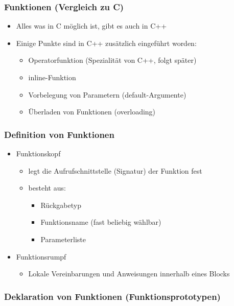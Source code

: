 \subsubsection{Funktionen (Vergleich zu C)\hfill}
\label{sec:unterunterabschnitt}
\begin{itemize}
	\item Alles was in C möglich ist, gibt es auch in C++
	\item Einige Punkte sind in C++ zusätzlich eingeführt worden:
	\begin{itemize}
		\item Operatorfunktion (Spezialität von C++, folgt später)
		\item inline-Funktion
		\item Vorbelegung von Parametern (default-Argumente)
		\item Überladen von Funktionen (overloading)
	\end{itemize}
\end{itemize}

\subsubsection{Definition von Funktionen\hfill}
\label{sec:unterunterabschnitt}
\begin{itemize}
	\item Funktionskopf
	\begin{itemize}
		\item legt die Aufrufschnittstelle (Signatur) der Funktion fest
		\item besteht aus:
		\begin{itemize}
			\item Rückgabetyp
			\item Funktionsname (fast beliebig wählbar)
			\item Parameterliste
		\end{itemize}
	\end{itemize}
	\item Funktionsrumpf
	\begin{itemize}
		\item Lokale Vereinbarungen und Anweisungen innerhalb eines Blocks
	\end{itemize}
\end{itemize}

\subsubsection{Deklaration von Funktionen (Funktionsprototypen)}
\label{sec:unterunterabschnitt}


